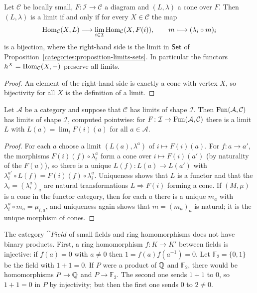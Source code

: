 \begin{proposition}\label{categories:proposition-hom-limits}
Let $\mathcal{C}$ be locally small, $F \colon \mathcal{I} \to \mathcal{C}$ a diagram and
$(L, \lambda)$ a cone over $F$. Then $(L, \lambda)$ is a limit if and only if for
every $X \in \mathcal{C}$ the map
\[
\operatorname{Hom}_{\mathcal{C}}(X, L) \longrightarrow \lim_{i \in \mathcal{I}} \operatorname{Hom}_{\mathcal{C}}(X, F(i)),
\qquad m \longmapsto (\lambda_i \circ m)_i
\]
is a bijection, where the right-hand side is the limit in $\mathsf{Set}$ of
Proposition~\ref{categories:proposition-limits-sets}. In particular the functors
$h^X = \operatorname{Hom}_{\mathcal{C}}(X, -)$ preserve all limits.
\end{proposition}

\begin{proof}
An element of the right-hand side is exactly a cone with vertex $X$, so
bijectivity for all $X$ is the definition of a limit.
\end{proof}

\begin{proposition}\label{categories:proposition-limits-functor-categories}
Let $\mathcal{A}$ be a category and suppose that $\mathcal{C}$ has limits of shape
$\mathcal{I}$. Then $\operatorname{Fun}(\mathcal{A}, \mathcal{C})$ has limits of shape $\mathcal{I}$,
computed pointwise: for $F \colon \mathcal{I} \to \operatorname{Fun}(\mathcal{A}, \mathcal{C})$ there is a
limit $L$ with $L(a) = \lim_i F(i)(a)$ for all $a \in \mathcal{A}$.
\end{proposition}

\begin{proof}
For each $a$ choose a limit $(L(a), \lambda^a)$ of $i \mapsto F(i)(a)$. For
$f \colon a \to a'$, the morphisms $F(i)(f) \circ \lambda^a_i$ form a cone over
$i \mapsto F(i)(a')$ (by naturality of the $F(u)$), so there is a unique
$L(f) \colon L(a) \to L(a')$ with $\lambda^{a'}_i \circ L(f) = F(i)(f) \circ \lambda^a_i$.
Uniqueness shows that $L$ is a functor and that the $\lambda_i = (\lambda^a_i)_a$ are
natural transformations $L \Rightarrow F(i)$ forming a cone. If $(M, \mu)$ is a cone in
the functor category, then for each $a$ there is a unique $m_a$ with
$\lambda^a_i \circ m_a = \mu_{i,a}$, and uniqueness again shows that $m = (m_a)_a$ is
natural; it is the unique morphism of cones.
\end{proof}

\begin{counterexample}\label{categories:counterexample-fields-products}
The category $\cat{Field}$ of small fields and ring homomorphisms does not have
binary products. First, a ring homomorphism $f \colon K \to K'$ between fields is
injective: if $f(a) = 0$ with $a \neq 0$ then $1 = f(a)f(a^{-1}) = 0$. Let
$\mathbb{F}_2 = \{0, 1\}$ be the field with $1 + 1 = 0$. If $P$ were a product of
$\mathbb{Q}$ and $\mathbb{F}_2$, there would be homomorphisms $P \to \mathbb{Q}$ and
$P \to \mathbb{F}_2$. The second one sends $1 + 1$ to $0$, so $1 + 1 = 0$ in $P$ by
injectivity; but then the first one sends $0$ to $2 \neq 0$.
\end{counterexample}

